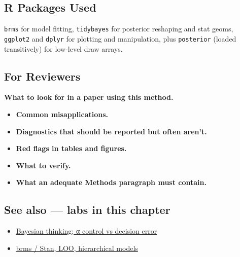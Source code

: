 \documentclass[
]{article}
\providecommand{\tightlist}{%
  \setlength{\itemsep}{0pt}\setlength{\parskip}{0pt}}
\begin{document}
\subsection{R Packages Used}\label{r-packages-used}

\texttt{brms} for model fitting, \texttt{tidybayes} for posterior
reshaping and stat geoms, \texttt{ggplot2} and \texttt{dplyr} for
plotting and manipulation, plus \texttt{posterior} (loaded transitively)
for low-level draw arrays.

\subsection{For Reviewers}\label{for-reviewers}

\textbf{What to look for in a paper using this method.}

\begin{itemize}
\tightlist
\item
  \textbf{Common misapplications.}
\item
  \textbf{Diagnostics that should be reported but often aren't.}
\item
  \textbf{Red flags in tables and figures.}
\item
  \textbf{What to verify.}
\item
  \textbf{What an adequate Methods paragraph must contain.}
\end{itemize}

\subsection{See also --- labs in this
chapter}\label{see-also-labs-in-this-chapter}

\begin{itemize}
\tightlist
\item
  \href{labs/lab-bayesian-thinking-control-vs-decision-error.Rmd}{Bayesian
  thinking; α control vs decision error}
\item
  \href{labs/lab-brms-stan-loo-hierarchical-models.Rmd}{brms / Stan,
  LOO, hierarchical models}
\end{itemize}
\end{document}
